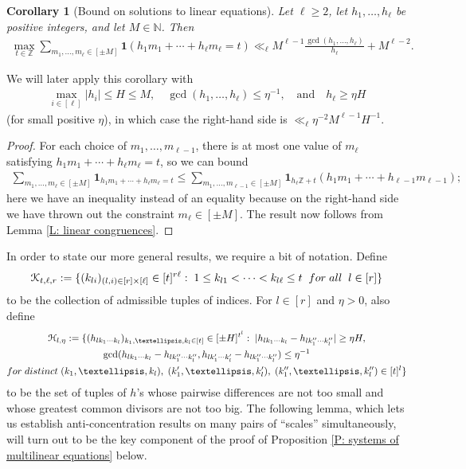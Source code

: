 \documentclass[11pt]{amsart}
\newtheorem{corollary}[lemma]{Corollary}
\theoremstyle{definition}
\newcommand{\N}{{\mathbb N}}
\newcommand{\Z}{{\mathbb Z}}
\newcommand{\CH}{{\mathcal H}}
\newcommand{\CK}{{\mathcal K}}
\newcommand{\inv}{^{-1}}
\begin{document}
\begin{corollary}[Bound on solutions to linear equations]\label{C: linear congruences}
    Let $\ell\geq 2$, let $h_1, \ldots, h_\ell$ be positive integers, and let $M\in\N$. Then
    \begin{align*}
        \max_{t\in\Z}\sum_{m_1, \ldots, m_\ell\in[\pm M]}\mathbf{1}(h_1 m_1 + \cdots + h_\ell m_\ell = t) \ll_\ell M^{\ell-1}\frac{\gcd(h_1, \ldots, h_\ell)}{h_\ell} + M^{\ell-2}.
    \end{align*}
\end{corollary}
We will later apply this corollary with
\begin{align*}
    \max_{i\in[\ell]}|h_i|\leq H \leq M,\quad \gcd(h_1, \ldots, h_\ell) \leq \eta^{-1}, \quad\textrm{and}\quad h_\ell \geq \eta H
\end{align*}
(for small positive $\eta$), in which case the right-hand side is $\ll_\ell \eta^{-2}M^{\ell-1}H^{-1}$.
\begin{proof}
    For each choice of $m_1, \ldots, m_{\ell-1}$, there is at most one value of $m_\ell$ satisfying $h_1 m_1 + \cdots + h_\ell m_\ell = t$, so we can bound
    \begin{align*}
        \sum_{m_1, \ldots, m_\ell\in[\pm M]}\mathbf{1}_{h_1 m_1 + \cdots + h_\ell m_\ell = t} \leq \sum_{m_1, \ldots, m_{\ell-1}\in[\pm M]}\mathbf{1}_{h_\ell \Z +t}(h_1 m_1 + \cdots + h_{\ell-1} m_{\ell-1});
    \end{align*}
    here we have an inequality instead of an equality because on the right-hand side we have thrown out the constraint $m_\ell \in [\pm M]$. The result now follows from Lemma \ref{L: linear congruences}.  
\end{proof}

In order to state our more general results, we require a bit of notation.  Define
\begin{align}\label{E:set K}
        \CK_{t, \ell, r} := \{(k_{li})_{\substack{(l,i)\in[r]\times[\ell]}}\in[t]^{r\ell}:\; 1\leq k_{l1}<\cdots < k_{l\ell}\leq t\;\; \textrm{for\; all}\;\; l\in[r]\}
    \end{align}
    to be the collection of admissible tuples of indices. For $l\in[r]$ and $\eta>0$, also define
    \begin{multline}\label{E: H_l}
        \CH_{l,\eta} := \{(h_{lk_1\cdots k_l})_{k_1, \ldots, k_l\in[t]}\in[\pm H]^{t^l}:\; |h_{lk_1\cdots k_l}-h_{lk''_1\cdots k''_l}|\geq \eta H,\\ \gcd(h_{lk_1\cdots k_l}-h_{lk''_1\cdots k''_l}, h_{lk'_1\cdots k'_l}-h_{lk''_1\cdots k''_l})\leq \eta\inv\\
    \textrm{for\; distinct}\; (k_1, \ldots, k_l),\; (k'_1, \ldots, k'_l),\; (k''_1, \ldots, k''_l)\in[t]^l\}
    \end{multline}
    to be the set of tuples of $h$'s whose pairwise differences are not too small and whose greatest common divisors are not too big.  The following lemma, which lets us establish anti-concentration results on many pairs of ``scales'' simultaneously, will turn out to be the key component of the proof of Proposition \ref{P: systems of multilinear equations} below.
    
\end{document}
